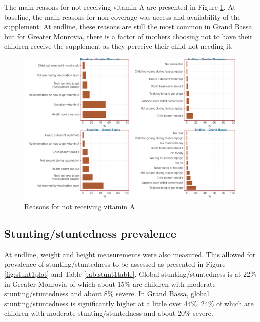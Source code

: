 \documentclass[12pt,a4paper]{article}
\begin{document}
The main reasons for not receiving vitamin A are presented in Figure \ref{fig:vit2plot}. At baseline, the main reasons for non-coverage was access and availability of the supplement. At endline, these reasons are still the most common in Grand Bassa but for Greater Monrovia, there is a factor of mothers choosing not to have their children receive the supplement as they perceive their child not needing it.

\begin{figure}[H]

{\centering \includegraphics{liberiaCoverageFinalReport_files/figure-latex/vit2plot-1} 

}

\caption{Reasons for not receiving vitamin A}\label{fig:vit2plot}
\end{figure}

\newpage

\hypertarget{stuntingstuntedness-prevalence}{%
\subsection{Stunting/stuntedness prevalence}\label{stuntingstuntedness-prevalence}}

At endline, weight and height measurements were also measured. This allowed for prevalence of stunting/stuntedness to be assessed as presented in Figure \ref{fig:stunt1plot} and Table \ref{tab:stunt1table}. Global stunting/stuntedness is at 22\% in Greater Monrovia of which about 15\% are children with moderate stunting/stuntedness and about 8\% severe. In Grand Bassa, global stunting/stuntedness is significantly higher at a little over 44\%, 24\% of which are children with moderate stunting/stuntedness and about 20\% severe.
\end{document}
